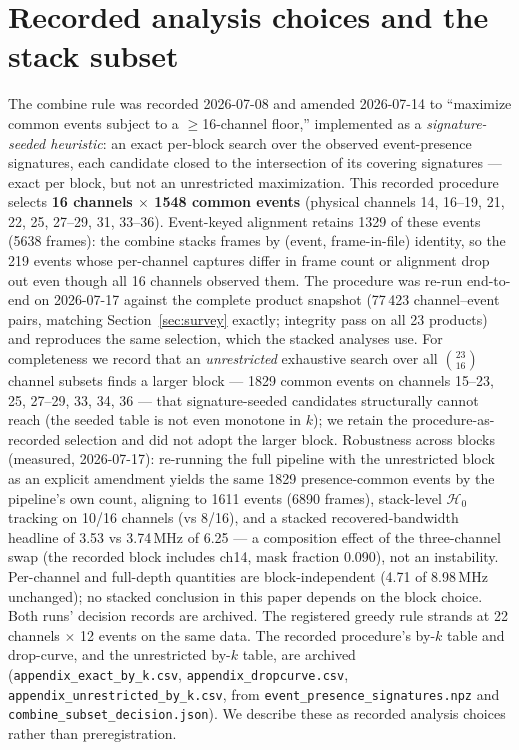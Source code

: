 \section{Recorded analysis choices and the stack subset}
\label{app:prereg}
The combine rule was recorded 2026-07-08 and amended 2026-07-14 to
``maximize common events subject to a $\ge$16-channel floor,''
implemented as a \emph{signature-seeded heuristic}: an exact per-block
search over the observed event-presence signatures, each candidate
closed to the intersection of its covering signatures --- exact per
block, but not an unrestricted maximization. This recorded procedure
selects \textbf{16
channels $\times$ 1548 common events} (physical channels 14, 16--19,
21, 22, 25, 27--29, 31, 33--36). Event-keyed alignment retains 1329 of
these events (5638 frames): the combine stacks frames by (event,
frame-in-file) identity, so the 219 events whose per-channel captures
differ in frame count or alignment drop out even though all 16 channels
observed them. The procedure was re-run end-to-end on 2026-07-17
against the complete product snapshot (77\,423 channel--event pairs,
matching Section~\ref{sec:survey} exactly; integrity pass on all 23
products) and reproduces the same selection, which the stacked
analyses use. For completeness we record that an \emph{unrestricted}
exhaustive search over all $\binom{23}{16}$ channel subsets finds a
larger block --- 1829 common events on channels 15--23, 25, 27--29, 33,
34, 36 --- that signature-seeded candidates structurally cannot reach
(the seeded table is not even monotone in $k$); we retain the
procedure-as-recorded selection and did not adopt the larger block.
Robustness across blocks (measured, 2026-07-17): re-running the full
pipeline with the unrestricted block as an explicit amendment yields the
same 1829 presence-common events by the pipeline's own count, aligning
to 1611 events (6890 frames), stack-level $\mathcal{H}_0$ tracking on
10/16 channels (vs 8/16), and a stacked recovered-bandwidth headline of
3.53 vs 3.74\,MHz of 6.25 --- a composition effect of the three-channel
swap (the recorded block includes ch14, mask fraction 0.090), not an
instability. Per-channel and full-depth quantities are block-independent
(4.71 of 8.98\,MHz unchanged); no stacked conclusion in this paper
depends on the block choice. Both runs' decision records are archived. The
registered greedy rule strands at 22 channels $\times$ 12 events on the
same data. The recorded procedure's by-$k$ table and drop-curve, and
the unrestricted by-$k$ table, are archived
(\texttt{appendix\_exact\_by\_k.csv}, \texttt{appendix\_dropcurve.csv},
\texttt{appendix\_unrestricted\_by\_k.csv}, from
\texttt{event\_presence\_signatures.npz} and
\texttt{combine\_subset\_decision.json}). We describe these as recorded
analysis choices rather than preregistration. 

